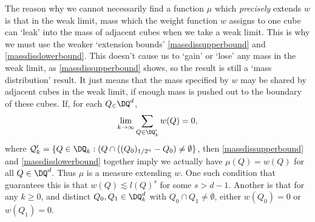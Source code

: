 \begin{remark}
	The reason why we cannot necessarily find a function $\mu$ which \emph{precisely} extends $w$ is that in the weak limit, mass which the weight function $w$ assigns to one cube can `leak' into the mass of adjacent cubes when we take a weak limit. This is why we must use the weaker `extension bounds' \eqref{massdissupperbound} and \eqref{massdisslowerbound}. This doesn't cause us to `gain' or `lose' any mass in the weak limit, as \eqref{massdissupperbound} shows, so the result is still a `mass distribution' result. It just means that the mass specified by $w$ may be shared by adjacent cubes in the weak limit, if enough mass is pushed out to the boundary of these cubes. If, for each $Q_ \in \DQ^d$,
	\[ \lim_{k \to \infty} \sum_{Q \in \DQ_k'} w(Q) = 0, \]
	where $\mathcal{Q}'_k = \{ Q \in \DQ_k : (Q \cap ((Q_0)_{1/2^n} - Q_0) \neq \emptyset \}$, then \eqref{massdissupperbound} and \eqref{massdisslowerbound} together imply we actually have $\mu(Q) = w(Q)$ for all $Q \in \DQ^d$. Thus $\mu$ is a measure extending $w$. One such condition that guarantees this is that $w(Q) \lesssim l(Q)^s$ for some $s > d-1$. Another is that for any $k \geq 0$, and distinct $Q_0, Q_1 \in \DQ_k^d$ with $Q_0 \cap Q_1 \neq \emptyset$, either $w(Q_0) = 0$ or $w(Q_1) = 0$.
\end{remark}


